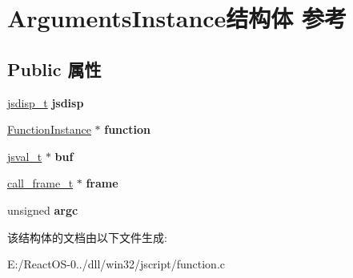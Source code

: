\hypertarget{struct_arguments_instance}{}\section{Arguments\+Instance结构体 参考}
\label{struct_arguments_instance}
\subsection*{Public 属性}
\begin{DoxyCompactItemize}
\item 
\mbox{\label{struct_arguments_instance_a8e7491d4b121ebb6bc0f4f34e3f2b718}} 
\hyperlink{structjsdisp__t}{jsdisp\+\_\+t} {\bfseries jsdisp}
\item 
\mbox{\label{struct_arguments_instance_ad74530ca2a8ab36f6b9e4d546d1c3f0e}} 
\hyperlink{struct_function_instance}{Function\+Instance} $\ast$ {\bfseries function}
\item 
\mbox{\label{struct_arguments_instance_abe2983e30b3ad32beaa4c76d3236a7f1}} 
\hyperlink{struct__jsval__t}{jsval\+\_\+t} $\ast$ {\bfseries buf}
\item 
\mbox{\label{struct_arguments_instance_a3cedbf5d26ade9cd1ecdc307d3857fef}} 
\hyperlink{struct__call__frame__t}{call\+\_\+frame\+\_\+t} $\ast$ {\bfseries frame}
\item 
\mbox{\label{struct_arguments_instance_ac57c3400508292dae470f94efe27ebaa}} 
unsigned {\bfseries argc}
\end{DoxyCompactItemize}


该结构体的文档由以下文件生成\+:\begin{DoxyCompactItemize}
\item 
E\+:/\+React\+O\+S-\/0../dll/win32/jscript/function.\+c\end{DoxyCompactItemize}
